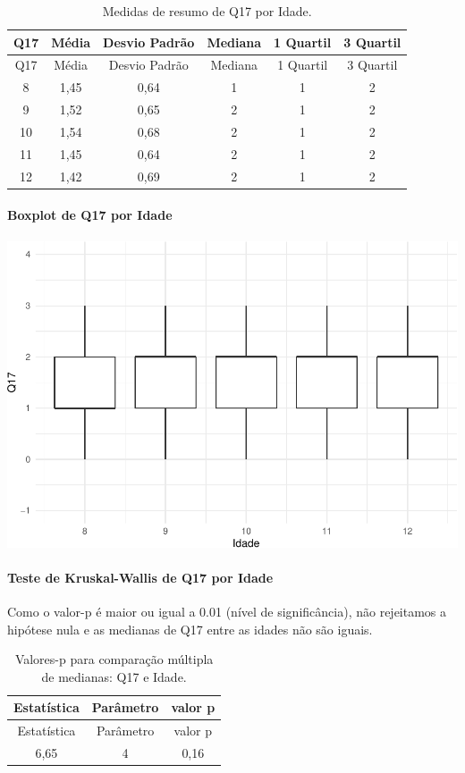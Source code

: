\documentclass[]{article}
\let\oldparagraph\paragraph
\renewcommand{\paragraph}[1]{\oldparagraph{#1}\mbox{}}
\begin{document}
\begin{longtable}[]{@{}cccccc@{}}
\caption{\label{tab:unnamed-chunk-213}Medidas de resumo de Q17 por Idade.}\tabularnewline
\toprule
Q17 & Média & Desvio Padrão & Mediana & 1 Quartil & 3 Quartil\tabularnewline
\midrule
\endfirsthead
\toprule
Q17 & Média & Desvio Padrão & Mediana & 1 Quartil & 3 Quartil\tabularnewline
\midrule
\endhead
8 & 1,45 & 0,64 & 1 & 1 & 2\tabularnewline
9 & 1,52 & 0,65 & 2 & 1 & 2\tabularnewline
10 & 1,54 & 0,68 & 2 & 1 & 2\tabularnewline
11 & 1,45 & 0,64 & 2 & 1 & 2\tabularnewline
12 & 1,42 & 0,69 & 2 & 1 & 2\tabularnewline
\bottomrule
\end{longtable}

\hypertarget{boxplot-de-q17-por-idade}{%
\paragraph{Boxplot de Q17 por Idade}\label{boxplot-de-q17-por-idade}}

\begin{center}\includegraphics[width=0.75\linewidth]{relatorio_covid19_files/figure-latex/unnamed-chunk-214-1} \end{center}

\hypertarget{teste-de-kruskal-wallis-de-q17-por-idade}{%
\paragraph{Teste de Kruskal-Wallis de Q17 por Idade}\label{teste-de-kruskal-wallis-de-q17-por-idade}}

Como o valor-p é maior ou igual a 0.01 (nível de significância), não rejeitamos a hipótese nula e as medianas de Q17 entre as idades não são iguais.

\begin{longtable}[]{@{}ccc@{}}
\caption{\label{tab:unnamed-chunk-216}Valores-p para comparação múltipla de medianas: Q17 e Idade.}\tabularnewline
\toprule
Estatística & Parâmetro & valor p\tabularnewline
\midrule
\endfirsthead
\toprule
Estatística & Parâmetro & valor p\tabularnewline
\midrule
\endhead
6,65 & 4 & 0,16\tabularnewline
\bottomrule
\end{longtable}
\end{document}
